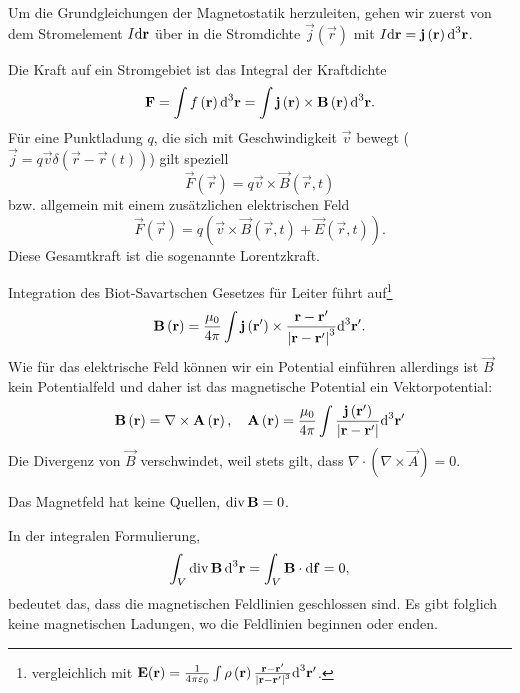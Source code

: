 Um die Grundgleichungen der Magnetostatik herzuleiten, gehen wir zuerst von dem Stromelement $I\text{d} \mathbf{r}$ über in die Stromdichte $\vec {j}\left(\vec {r}\right)$ mit $I\text{d} \mathbf{r}=\mathbf{j}\left(\mathbf{r}\right)\text{d}^3 \mathbf{r}$.

Die Kraft auf ein Stromgebiet ist das Integral der Kraftdichte
\begin{equation*}
	\mathbf{F}=\int f\left(\mathbf{r}\right)\text{d} ^{3}\mathbf{r}=\int \mathbf{j}\left(\mathbf{r}\right)\times \mathbf{B}\left(\mathbf{r}\right)\text{d} ^{3}\mathbf{r}.
\end{equation*}
Für eine Punktladung $q$, die sich mit Geschwindigkeit $\vec {v}$ bewegt ($\vec {j}=q\vec {v}\delta \left(\vec {r}-\vec {r}\left(t\right)\right)$) gilt speziell
\begin{equation*}
	\vec F\left(\vec {r}\right)=q\vec {v}\times \vec {B}\left(\vec {r},t\right)
\end{equation*}
bzw. allgemein mit einem zusätzlichen elektrischen Feld
\begin{equation*}
	\vec F\left(\vec {r}\right)=q\left(\vec {v}\times \vec {B}\left(\vec {r},t\right)+\vec {E}\left(\vec {r},t\right)\right).
\end{equation*}
Diese Gesamtkraft ist die sogenannte Lorentzkraft.

Integration des Biot-Savartschen Gesetzes für Leiter führt auf\footnote{vergleichlich mit $\mathbf{E}(\mathbf{r})=\frac{1}{4\pi \varepsilon _{0}}\int \rho \left(\mathbf{r}\right)\frac{\mathbf{r}-\mathbf{r}'}{\left| \mathbf{r}-\mathbf{r}'\right| ^{3}}\text{d} ^{3}\mathbf{r}'$.}
\begin{equation*}
	\mathbf{B}\left(\mathbf{r}\right)=\frac{\mu _{0}}{4\pi }\int \mathbf{j}\left(\mathbf{r'}\right)\times \frac{\mathbf{r}-\mathbf{r}'}{\left| \mathbf{r}-\mathbf{r}'\right| ^{3}}\text{d} ^{3}\mathbf{r}'.
\end{equation*}
Wie für das elektrische Feld können wir ein Potential einführen \textendash{} allerdings ist $\vec {B}$ kein Potentialfeld und daher ist das magnetische Potential ein Vektorpotential:
\begin{equation*}
	\mathbf{B}\left(\mathbf{r}\right)=\nabla \times \mathbf{A}\left(\mathbf{r}\right), \quad\mathbf{A}\left(\mathbf{r}\right)=\frac{\mu _{0}}{4\pi }\int \frac{\mathbf{j}\left(\mathbf{r}'\right)}{\left| \mathbf{r}-\mathbf{r}'\right| }\text{d} ^{3}\mathbf{r}'
\end{equation*}
Die Divergenz von $\vec {B}$ verschwindet, weil stets gilt, dass $\nabla\cdot(\nabla\times \vec A) = 0$.
\begin{formal}
		Das Magnetfeld hat keine Quellen, $\operatorname{div} \mathbf{B}=0$.
\end{formal}
In der integralen Formulierung,
\begin{equation*}
	\int _{V}\operatorname{div} \mathbf{B}\,\text{d} ^{3}\mathbf{r}=\int _{V}\mathbf{B}\cdot \text{d} \mathbf{f}=0,
\end{equation*}
bedeutet das, dass die magnetischen Feldlinien geschlossen sind. Es gibt folglich keine magnetischen Ladungen, wo die Feldlinien beginnen oder enden.

